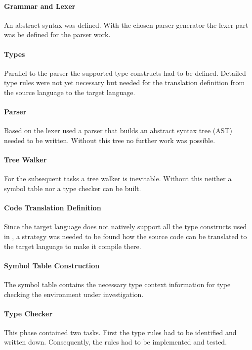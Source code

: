 \paragraph{Grammar and Lexer}
An abstract syntax was defined. With the chosen parser generator
the lexer part was be defined for the parser work.

\paragraph{Types}
Parallel to the parser the supported type constructs had to be
defined. Detailed type rules were not yet necessary but needed for the
translation definition from the source language to the target language.

\paragraph{Parser}
Based on the lexer used a parser that builds an abstract syntax tree
(AST) needed to be written. Without this tree no further work was possible.

\paragraph{Tree Walker}
For the subsequent tasks a tree walker is inevitable. Without this
neither a symbol table nor a type checker can be built.

\paragraph{Code Translation Definition}
Since the target language does not natively support all the type
constructs used in \ooplss, a strategy was needed to be found
how the source code can be translated to the target language to make it
compile there.

\paragraph{Symbol Table Construction}
The symbol table contains the necessary type context information for
type checking the environment under investigation.

\paragraph{Type Checker}
This phase contained two tasks. First the type rules had to be identified
and written down. Consequently, the rules had to be implemented and tested.

